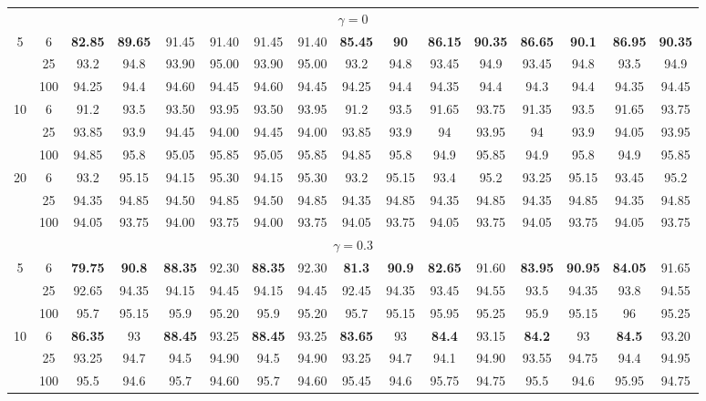 \documentclass[
  man]{apa6}
\newenvironment{lltable}{\begin{landscape}\centering\begin{ThreePartTable}}{\end{ThreePartTable}\end{landscape}}
\begin{document}
\begin{lltable}
{\begin{longtable}{cccccccccccccccc}
\midrule
\endhead
\multicolumn{16}{c}{$\gamma = 0$}\\
5 & 6 & \textbf{82.85} & \textbf{89.65} & 91.45 & 91.40 & 91.45 & 91.40 & \textbf{85.45} & \textbf{90} & \textbf{86.15} & \textbf{90.35} & \textbf{86.65} & \textbf{90.1} & \textbf{86.95} & \textbf{90.35}\\
 & 25 & 93.2 & 94.8 & 93.90 & 95.00 & 93.90 & 95.00 & 93.2 & 94.8 & 93.45 & 94.9 & 93.45 & 94.8 & 93.5 & 94.9\\
 & 100 & 94.25 & 94.4 & 94.60 & 94.45 & 94.60 & 94.45 & 94.25 & 94.4 & 94.35 & 94.4 & 94.3 & 94.4 & 94.35 & 94.45\\
10 & 6 & 91.2 & 93.5 & 93.50 & 93.95 & 93.50 & 93.95 & 91.2 & 93.5 & 91.65 & 93.75 & 91.35 & 93.5 & 91.65 & 93.75\\
 & 25 & 93.85 & 93.9 & 94.45 & 94.00 & 94.45 & 94.00 & 93.85 & 93.9 & 94 & 93.95 & 94 & 93.9 & 94.05 & 93.95\\
 & 100 & 94.85 & 95.8 & 95.05 & 95.85 & 95.05 & 95.85 & 94.85 & 95.8 & 94.9 & 95.85 & 94.9 & 95.8 & 94.9 & 95.85\\
20 & 6 & 93.2 & 95.15 & 94.15 & 95.30 & 94.15 & 95.30 & 93.2 & 95.15 & 93.4 & 95.2 & 93.25 & 95.15 & 93.45 & 95.2\\
 & 25 & 94.35 & 94.85 & 94.50 & 94.85 & 94.50 & 94.85 & 94.35 & 94.85 & 94.35 & 94.85 & 94.35 & 94.85 & 94.35 & 94.85\\
 & 100 & 94.05 & 93.75 & 94.00 & 93.75 & 94.00 & 93.75 & 94.05 & 93.75 & 94.05 & 93.75 & 94.05 & 93.75 & 94.05 & 93.75\\
\multicolumn{16}{c}{$\gamma = 0.3$}\\
5 & 6 & \textbf{79.75} & \textbf{90.8} & \textbf{88.35} & 92.30 & \textbf{88.35} & 92.30 & \textbf{81.3} & \textbf{90.9} & \textbf{82.65} & 91.60 & \textbf{83.95} & \textbf{90.95} & \textbf{84.05} & 91.65\\
 & 25 & 92.65 & 94.35 & 94.15 & 94.45 & 94.15 & 94.45 & 92.45 & 94.35 & 93.45 & 94.55 & 93.5 & 94.35 & 93.8 & 94.55\\
 & 100 & 95.7 & 95.15 & 95.9 & 95.20 & 95.9 & 95.20 & 95.7 & 95.15 & 95.95 & 95.25 & 95.9 & 95.15 & 96 & 95.25\\
10 & 6 & \textbf{86.35} & 93 & \textbf{88.45} & 93.25 & \textbf{88.45} & 93.25 & \textbf{83.65} & 93 & \textbf{84.4} & 93.15 & \textbf{84.2} & 93 & \textbf{84.5} & 93.20\\
 & 25 & 93.25 & 94.7 & 94.5 & 94.90 & 94.5 & 94.90 & 93.25 & 94.7 & 94.1 & 94.90 & 93.55 & 94.75 & 94.4 & 94.95\\
 & 100 & 95.5 & 94.6 & 95.7 & 94.60 & 95.7 & 94.60 & 95.45 & 94.6 & 95.75 & 94.75 & 95.5 & 94.6 & 95.95 & 94.75\\

\end{longtable}}
\end{lltable}
\end{document}
